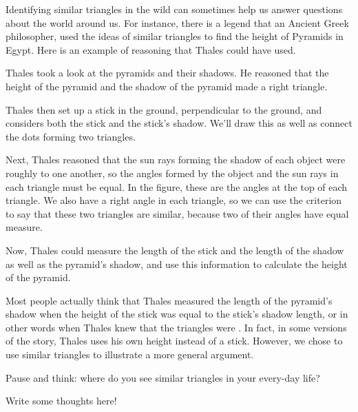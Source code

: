\documentclass{ximera}
\begin{document}
Identifying similar triangles in the wild can sometimes help us answer questions about the world around us. For instance, there is a legend that an Ancient Greek philosopher,  used the ideas of similar triangles to find the height of Pyramids in Egypt. Here is an example of reasoning that Thales could have used.
\begin{example}
Thales took a look at the pyramids and their shadows. He reasoned that the height of the pyramid and the shadow of the pyramid made a right triangle.
\begin{image}
\end{image}
Thales then set up a stick in the ground, perpendicular to the ground, and considers both the stick and the stick's shadow. We'll draw this as well as connect the dots forming two triangles.
\begin{image}
\end{image}
Next, Thales reasoned that the sun rays forming the shadow of each object were roughly  to one another, so the angles formed by the object and the sun rays in each triangle must be equal. In the figure, these are the angles at the top of each triangle. We also have a right angle in each triangle, so we can use the  criterion to say that these two triangles are similar, because two of their angles have equal measure.

Now, Thales could measure the length of the stick and the length of the shadow as well as the pyramid's shadow, and use this information to calculate the height of the pyramid.

\end{example}
Most people actually think that Thales measured the length of the pyramid's shadow when the height of the stick was equal to the stick's shadow length, or in other words when Thales knew that the triangles were . In fact, in some versions of the story, Thales uses his own height instead of a stick. However, we chose to use similar triangles to illustrate a more general argument.

\begin{question}
Pause and think: where do you see similar triangles in your every-day life?
\begin{freeResponse}
Write some thoughts here!
\end{freeResponse}
\end{question}
\end{document}
